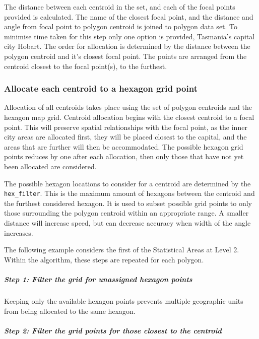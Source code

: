 \documentclass{monashthesis}
\begin{document}
The distance between each centroid in the set, and each of the focal points provided is calculated. The name of the closest focal point, and the distance and angle from focal point to polygon centroid is joined to polygon data set. To minimise time taken for this step only one option is provided, Tasmania's capital city Hobart.
The order for allocation is determined by the distance between the polygon centroid and it's closest focal point. The points are arranged from the centroid closest to the focal point(s), to the furthest.

\hypertarget{allocate-each-centroid-to-a-hexagon-grid-point}{%
\subsubsection{Allocate each centroid to a hexagon grid point}\label{allocate-each-centroid-to-a-hexagon-grid-point}}

Allocation of all centroids takes place using the set of polygon centroids and the hexagon map grid.
Centroid allocation begins with the closest centroid to a focal point.
This will preserve spatial relationships with the focal point, as the inner city areas are allocated first, they will be placed closest to the capital, and the areas that are further will then be accommodated.
The possible hexagon grid points reduces by one after each allocation, then only those that have not yet been allocated are considered.

The possible hexagon locations to consider for a centroid are determined by the \texttt{hex\_filter}. This is the maximum amount of hexagons between the centroid and the furthest considered hexagon. It is used to subset possible grid points to only those surrounding the polygon centroid within an appropriate range. A smaller distance will increase speed, but can decrease accuracy when width of the angle increases.

The following example considers the first of the Statistical Areas at Level 2.
Within the algorithm, these steps are repeated for each polygon.

\hypertarget{step-1-filter-the-grid-for-unassigned-hexagon-points}{%
\subparagraph{Step 1: Filter the grid for unassigned hexagon points}\label{step-1-filter-the-grid-for-unassigned-hexagon-points}}

Keeping only the available hexagon points prevents multiple geographic units from being allocated to the same hexagon.

\hypertarget{step-2-filter-the-grid-points-for-those-closest-to-the-centroid}{%
\subparagraph{Step 2: Filter the grid points for those closest to the centroid}\label{step-2-filter-the-grid-points-for-those-closest-to-the-centroid}}
\end{document}
